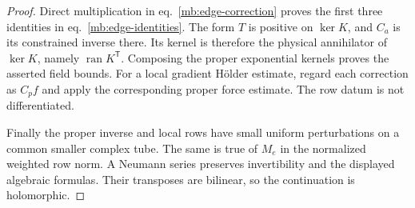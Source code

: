 \documentclass[11pt,letterpaper,reqno]{amsart}
\numberwithin{equation}{section}
\renewcommand{\eqref}[1]{\textup{eq.~\ref{#1}}}
\theoremstyle{definition}
\theoremstyle{remark}
\begin{document}
\begin{proof}
Direct multiplication in \eqref{mb:edge-correction} proves
the first three identities in \eqref{mb:edge-identities}.
The form $T$ is positive on $\ker K$, and $C_a$ is its
constrained inverse there. Its kernel is therefore the
physical annihilator of $\ker K$, namely
$\operatorname{ran}K^{\mathsf T}$. Composing the proper
exponential kernels proves the asserted field bounds. For a
local gradient H\"older estimate, regard each correction as
$C_pf$ and apply the corresponding proper force estimate.
The row datum is not differentiated.

Finally the proper inverse and local rows have small uniform
perturbations on a common smaller complex tube. The same is
true of $M_e$ in the normalized weighted row norm. A Neumann
series preserves invertibility and the displayed algebraic
formulas. Their transposes are bilinear, so the continuation
is holomorphic.
\end{proof}
\end{document}
